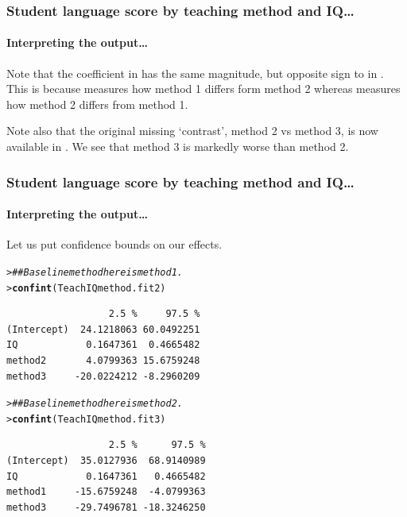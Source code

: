 \documentclass{beamer}\usepackage[]{graphicx}\usepackage[]{xcolor}
\makeatletter
\newcommand{\hlcom}[1]{\textcolor[rgb]{0.678,0.584,0.686}{\textit{#1}}}%
\newcommand{\hlstd}[1]{\textcolor[rgb]{0.345,0.345,0.345}{#1}}%
\newcommand{\hlkwd}[1]{\textcolor[rgb]{0.737,0.353,0.396}{\textbf{#1}}}%
\newenvironment{kframe}{%
 \def\at@end@of@kframe{}%
 \ifinner\ifhmode%
  \def\at@end@of@kframe{\end{minipage}}%
  \begin{minipage}{\columnwidth}%
 \fi\fi%
 \def\FrameCommand##1{\hskip\@totalleftmargin \hskip-\fboxsep
 \colorbox{shadecolor}{##1}\hskip-\fboxsep
     \hskip-\linewidth \hskip-\@totalleftmargin \hskip\columnwidth}%
 \MakeFramed {\advance\hsize-\width
   \@totalleftmargin\z@ \linewidth\hsize
   \@setminipage}}%
 {\par\unskip\endMakeFramed%
 \at@end@of@kframe}
\newenvironment{knitrout}{}{} %
\makeatother
\begin{document}
\begin{frame}[fragile]
\frametitle{Student language score by  teaching method and IQ\ldots}
\framesubtitle{Interpreting the output\ldots}
Note that the  coefficient in  has the same magnitude, but opposite sign to  in . This is because  measures how method 1 differs form method 2 whereas  measures how method 2 differs from method 1.

\bigskip 
Note also that the original missing `contrast', method 2 vs method 3, is now available in . We see that method 3 is markedly worse than method 2.
\vfill
\end{frame}


\begin{frame}[fragile]
\frametitle{Student language score by  teaching method and IQ\ldots}
\framesubtitle{Interpreting the output\ldots}
Let us put confidence bounds on our effects.
\bigskip
\begin{knitrout}\scriptsize
{}\color{fgcolor}\begin{kframe}
\begin{alltt}
\hlstd{> }\hlcom{## Baseline method here is method1.}
\hlstd{> }\hlkwd{confint}\hlstd{(TeachIQmethod.fit2)}
\end{alltt}
\begin{verbatim}
                  2.5 %     97.5 %
(Intercept)  24.1218063 60.0492251
IQ            0.1647361  0.4665482
method2       4.0799363 15.6759248
method3     -20.0224212 -8.2960209
\end{verbatim}
\end{kframe}
\end{knitrout}

\begin{knitrout}\scriptsize
{}\color{fgcolor}\begin{kframe}
\begin{alltt}
\hlstd{> }\hlcom{## Baseline method here is method2.}
\hlstd{> }\hlkwd{confint}\hlstd{(TeachIQmethod.fit3)}
\end{alltt}
\begin{verbatim}
                  2.5 %      97.5 %
(Intercept)  35.0127936  68.9140989
IQ            0.1647361   0.4665482
method1     -15.6759248  -4.0799363
method3     -29.7496781 -18.3246250
\end{verbatim}
\end{kframe}
\end{knitrout}
\end{frame}
\end{document}
